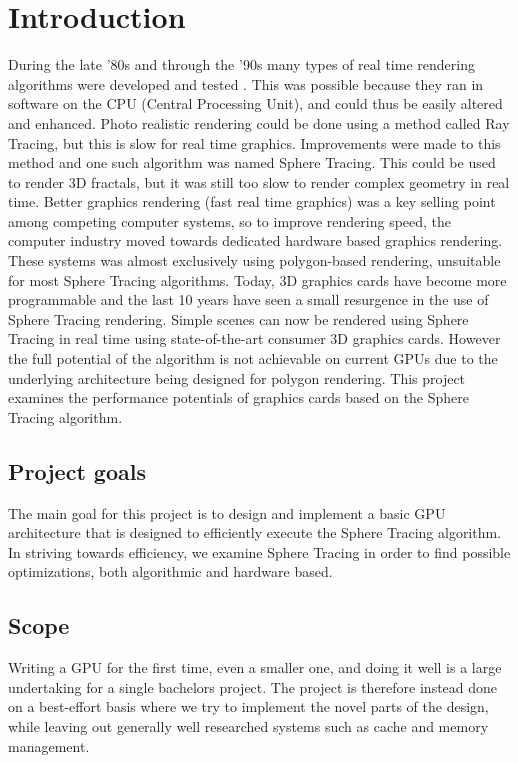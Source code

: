 \chapter{Introduction} 	

	During the late '80s and through the '90s many types of real time rendering
	algorithms were developed and tested \cite{Hart1989}. This was possible
	because they ran in software on the	CPU (Central Processing Unit), and
	could thus be easily altered and enhanced. Photo realistic rendering could
	be done using a method called Ray Tracing, but this is slow for real time
	graphics\cite{Shirley2005}. Improvements were made to this method and one
	such algorithm was named Sphere Tracing. This could be used to render 3D
	fractals\cite{Hart1989}, but it was	still too slow to render complex
	geometry in real time\cite{Hart1989}. Better graphics rendering (fast real
	time graphics) was a key selling point among competing computer systems, so
	to improve rendering speed, the computer industry moved towards dedicated
	hardware based graphics rendering\cite{Houston2010}. These systems was
	almost exclusively using polygon-based	rendering, unsuitable for most
	Sphere Tracing algorithms. Today, 3D graphics cards have become more
	programmable and the last 10 years have seen a small resurgence in the use
	of Sphere Tracing rendering\cite{Quilez2008}. Simple scenes can now be
	rendered using Sphere Tracing in real time using state-of-the-art consumer
	3D graphics cards. However the full potential of the algorithm is not
	achievable on current GPUs due to the underlying architecture being
	designed for polygon rendering\cite{Houston2010}. This project examines the
	performance	potentials of graphics cards based on the Sphere Tracing 
	algorithm.


	\section{Project goals}
	
		The main goal for this project is to design and implement a basic GPU 
		architecture that is designed to efficiently execute the Sphere Tracing 
		algorithm. In striving towards efficiency, we examine Sphere Tracing in 
		order to find possible optimizations, both algorithmic and hardware 
		based.
		
	\section{Scope}

		Writing a GPU for the first time, even a smaller one, and doing it well
		is a large undertaking for a single bachelors project. The project is
		therefore instead done on a best-effort basis where we try to implement
		the novel parts of the design, while leaving out generally well
		researched systems such as cache and memory management.
